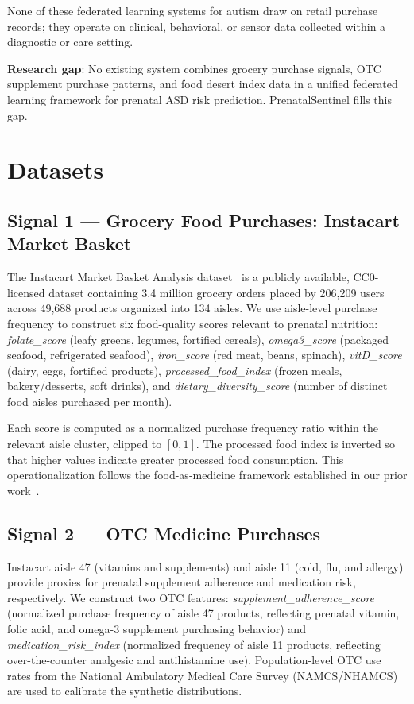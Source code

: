 \documentclass[journal]{IEEEtran}
\begin{document}
None of these federated learning systems for autism draw on retail
purchase records; they operate on clinical, behavioral, or sensor
data collected within a diagnostic or care setting.

\textbf{Research gap}: No existing system combines grocery purchase
signals, OTC supplement purchase patterns, and food desert index data
in a unified federated learning framework for prenatal ASD risk
prediction. PrenatalSentinel fills this gap.

\section{Datasets}
\label{sec:datasets}

\subsection{Signal 1 --- Grocery Food Purchases: Instacart Market Basket}

The Instacart Market Basket Analysis dataset~\cite{instacart2017} is
a publicly available, CC0-licensed dataset containing 3.4 million
grocery orders placed by 206,209 users across 49,688 products
organized into 134 aisles. We use aisle-level purchase frequency
to construct six food-quality scores relevant to prenatal nutrition:
\textit{folate\_score} (leafy greens, legumes, fortified cereals),
\textit{omega3\_score} (packaged seafood, refrigerated seafood),
\textit{iron\_score} (red meat, beans, spinach),
\textit{vitD\_score} (dairy, eggs, fortified products),
\textit{processed\_food\_index} (frozen meals, bakery/desserts,
soft drinks), and \textit{dietary\_diversity\_score} (number of
distinct food aisles purchased per month).

Each score is computed as a normalized purchase frequency ratio
within the relevant aisle cluster, clipped to $[0,1]$. The
processed food index is inverted so that higher values indicate
greater processed food consumption. This operationalization follows
the food-as-medicine framework established in our prior
work~\cite{poreddy2024foodmedicine}.

\subsection{Signal 2 --- OTC Medicine Purchases}

Instacart aisle 47 (vitamins and supplements) and aisle 11
(cold, flu, and allergy) provide proxies for prenatal supplement
adherence and medication risk, respectively. We construct two
OTC features: \textit{supplement\_adherence\_score} (normalized
purchase frequency of aisle 47 products, reflecting prenatal
vitamin, folic acid, and omega-3 supplement purchasing behavior)
and \textit{medication\_risk\_index} (normalized frequency of
aisle 11 products, reflecting over-the-counter analgesic and
antihistamine use). Population-level OTC use rates from the
National Ambulatory Medical Care Survey (NAMCS/NHAMCS)~\cite{cdc2023namcs}
are used to calibrate the synthetic distributions.
\end{document}
